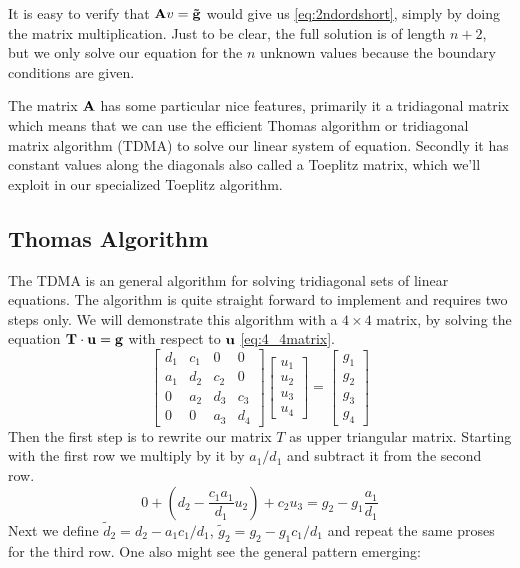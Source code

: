 It is easy to verify that $\mathbf{A} v = \mathbf{\tilde{g}}$ would give us 
\cref{eq:2ndordshort}, simply by doing the matrix multiplication. Just to be
clear, the full solution is of length $n+2$,
but we only solve our equation for the $n$ unknown values because the boundary
conditions are given. \par The matrix $\mathbf{A}$ has some
particular nice features, primarily it a tridiagonal matrix which means that we
can use the efficient Thomas algorithm or tridiagonal matrix algorithm (TDMA) to
solve our linear system of equation. 
Secondly it has constant values along the diagonals also called a Toeplitz
matrix, which we'll exploit in our specialized Toeplitz algorithm.    
\subsection*{Thomas Algorithm}

The TDMA is an general algorithm for solving tridiagonal sets of
linear equations. The algorithm is quite straight forward to implement and 
requires two steps only.
We will demonstrate this algorithm with a $4 \times 4$ matrix, by solving 
the equation $\mathbf{T} \cdot \mathbf{u} = \mathbf{g}$ with respect to $\mathbf{u}$
\cref{eq:4_4matrix}. 
\begin{equation}\label{eq:4_4matrix}
  \begin{bmatrix}
    d_1 & c_1 & 0 & 0 \\
    a_1 & d_2 & c_2 & 0 \\
    0 & a_2 & d_3 & c_3  \\
    0 & 0 & a_3 & d_4
  \end{bmatrix} \begin{bmatrix}
    u_1 \\ u_2 \\ u_3 \\ u_4
  \end{bmatrix} = \begin{bmatrix}
    g_1 \\ g_2 \\ g_3 \\ g_4
  \end{bmatrix}
\end{equation}
Then the first step is to rewrite our matrix $T$ as upper triangular matrix.
Starting with the first row we multiply by it by $a_1/d_1$ and subtract
it from the second row.
\begin{equation*}
  0 + \left(d_2 - \frac{c_1 a_1}{d_1}u_2 \right)+ c_2u_3 = g_2 -g_1
  \frac{a_1}{d_1}
\end{equation*}
Next we define $\tilde{d}_2 = d_2 - a_1 c_1/d_1$,
$\tilde{g}_2 =  g_2 - g_1 c_1/d_1$ and repeat the same proses for the third row.
One also might see the general pattern emerging:

